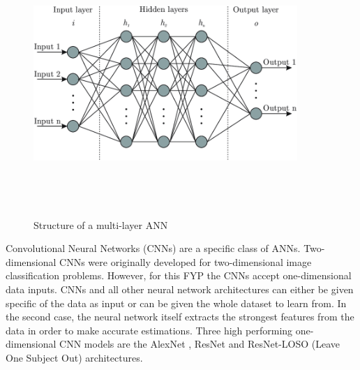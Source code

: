  \begin{figure}[H]
    \centering
    \includegraphics[width=10cm,height=10cm,keepaspectratio]{Background/ann.png}
    \caption{Structure of a multi-layer ANN \cite{deeplearning}}
    \label{ann}
\end{figure}\noindent Convolutional Neural Networks (CNNs) are a specific class of 
ANNs. Two-dimensional CNNs were originally developed for two-dimensional image classification problems. However, for this FYP the CNNs accept one-dimensional data inputs. 
CNNs and all other neural network architectures can either be given specific of the data as input or can be given the whole dataset to learn from. In the second case, the neural network 
itself extracts the strongest features from the data in order to make accurate estimations. Three high performing one-dimensional CNN models are the AlexNet \cite{alexNet}, ResNet \cite{resnetArch} and 
ResNet-LOSO (Leave One Subject Out) \cite{slapnicar2019} architectures.

